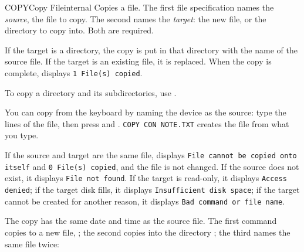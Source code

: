 \begin{DosEntry}{COPY}{Copy File}{internal}
\Purpose Copies a file.
\Format {}
\Remarks
The first file specification names the \emph{source}, the file to copy.
The second names the \emph{target}: the new file, or the directory to copy
into.  Both are required.

If the target is a directory, the copy is put in that directory with the
name of the source file.  If the target is an existing file, it is
replaced.  When the copy is complete,  displays
\texttt{1 File(s) copied}.

To copy a directory and its subdirectories, use .

You can copy from the keyboard by naming the device  as the
source: type the lines of the file, then press  and
.  \texttt{COPY CON NOTE.TXT} creates the file 
from what you type.

If the source and target are the same file,  displays
\texttt{File cannot be copied onto itself} and \texttt{0 File(s) copied},
and the file is not changed.  If the source does not exist, it displays
\texttt{File not found}.  If the target is read-only, it displays
\texttt{Access denied}; if the target disk fills, it displays
\texttt{Insufficient disk space}; if the target cannot be created for
another reason, it displays \texttt{Bad command or file name}.

The copy has the same date and time as the source file.
\Example
The first command copies  to a new file, ; the
second copies  into the directory ; the third
names the same file twice:
\end{DosEntry}

